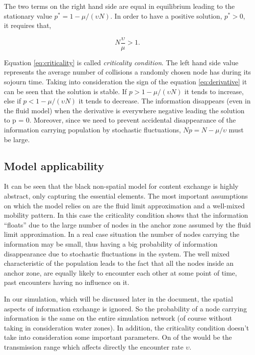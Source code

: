 The two terms on the right hand side are equal in equilibrium leading to the
stationary value $p^* = 1 - \mu / (\upsilon N)$. In order to have a positive
solution, $p^* > 0$, it requires that,

\begin{equation}
N\frac{\upsilon}{\mu} > 1. \label{eq:criticality}
\end{equation}

Equation \eqref{eq:criticality} is called {\it criticality condition}. The left
hand side value represents the average number of collisions a randomly chosen
node has during its sojourn time. Taking into consideration the sign of
the equation \eqref{eq:derivative} it can be seen that the solution is stable.
If $p > 1 - \mu / (\upsilon N)$ it tends to increase, else if $p < 1 - \mu /
(\upsilon N)$ it tends to decrease. The information disappears (even in the
fluid model) when the derivative is everywhere negative leading the solution to
p = 0. Moreover, since we need to prevent accidental disappearance of the
information carrying population by stochastic fluctuations, $Np = N - \mu /
\upsilon$ must be large.

\subsection{Model applicability}

It can be seen that the black non-spatial model for content exchange is highly
abstract, only capturing the essential elements. The most important assumptions
on which the model relies on are the fluid limit approximation and a well-mixed
mobility pattern. In this case the criticality condition shows that the
information ``floats'' due to the large number of nodes in the anchor zone
assumed by the fluid limit approximation. In a real case situation the number of
nodes carrying the information may be small, thus having a big probability of
information disappearance due to stochastic fluctuations in the system. The well
mixed characteristic of the population leads to the fact that all the nodes
inside an anchor zone, are equally likely to encounter each other at some point
of time, past encounters having no influence on it.

In our simulation, which will be discussed later in the document, the spatial
aspects of information exchange is ignored. So the probability of a node
carrying information is the same on the entire simulation network (of course
without taking in consideration water zones). In addition, the criticality
condition doesn't take into consideration some important parameters. On of the
would be the transmission range which affects directly the encounter rate
$\upsilon$.

